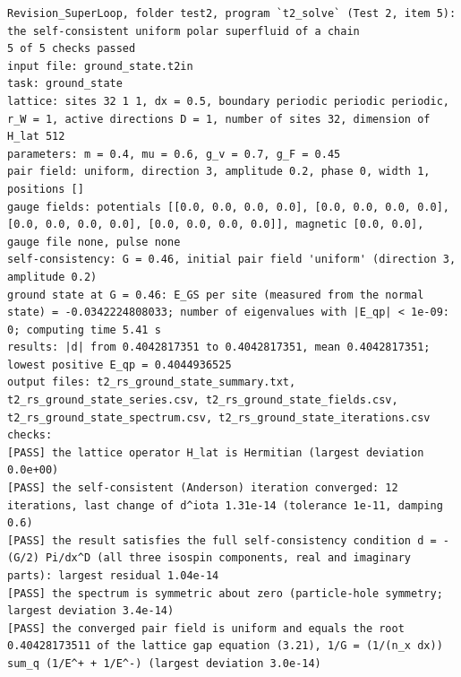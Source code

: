 \documentclass[
  10pt,
]{article}
\begin{document}
\begin{verbatim}
Revision_SuperLoop, folder test2, program `t2_solve` (Test 2, item 5): the self-consistent uniform polar superfluid of a chain
5 of 5 checks passed
input file: ground_state.t2in
task: ground_state
lattice: sites 32 1 1, dx = 0.5, boundary periodic periodic periodic, r_W = 1, active directions D = 1, number of sites 32, dimension of H_lat 512
parameters: m = 0.4, mu = 0.6, g_v = 0.7, g_F = 0.45
pair field: uniform, direction 3, amplitude 0.2, phase 0, width 1, positions []
gauge fields: potentials [[0.0, 0.0, 0.0, 0.0], [0.0, 0.0, 0.0, 0.0], [0.0, 0.0, 0.0, 0.0], [0.0, 0.0, 0.0, 0.0]], magnetic [0.0, 0.0], gauge file none, pulse none
self-consistency: G = 0.46, initial pair field 'uniform' (direction 3, amplitude 0.2)
ground state at G = 0.46: E_GS per site (measured from the normal state) = -0.0342224808033; number of eigenvalues with |E_qp| < 1e-09: 0; computing time 5.41 s
results: |d| from 0.4042817351 to 0.4042817351, mean 0.4042817351; lowest positive E_qp = 0.4044936525
output files: t2_rs_ground_state_summary.txt, t2_rs_ground_state_series.csv, t2_rs_ground_state_fields.csv, t2_rs_ground_state_spectrum.csv, t2_rs_ground_state_iterations.csv
checks:
[PASS] the lattice operator H_lat is Hermitian (largest deviation 0.0e+00)
[PASS] the self-consistent (Anderson) iteration converged: 12 iterations, last change of d^iota 1.31e-14 (tolerance 1e-11, damping 0.6)
[PASS] the result satisfies the full self-consistency condition d = -(G/2) Pi/dx^D (all three isospin components, real and imaginary parts): largest residual 1.04e-14
[PASS] the spectrum is symmetric about zero (particle-hole symmetry; largest deviation 3.4e-14)
[PASS] the converged pair field is uniform and equals the root 0.40428173511 of the lattice gap equation (3.21), 1/G = (1/(n_x dx)) sum_q (1/E^+ + 1/E^-) (largest deviation 3.0e-14)
\end{verbatim}
\end{document}
